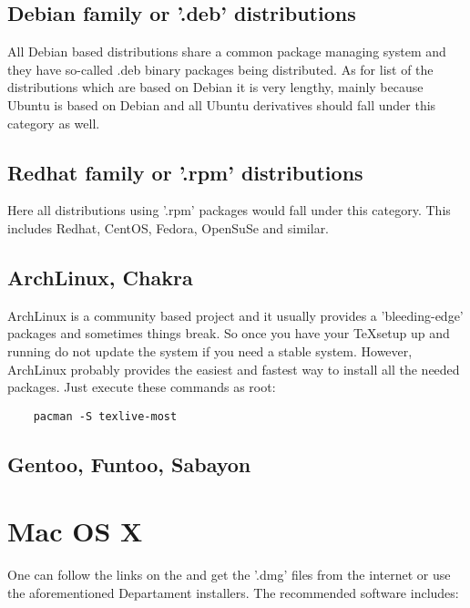 \documentclass[a4paper]{article}
\begin{document}
\subsection{Debian family or '.deb' distributions}

All Debian based distributions share a common package managing system and they
have so-called .deb binary packages being distributed. As for list of the
distributions which are based on Debian it is very lengthy, mainly because
Ubuntu is based on Debian and all Ubuntu derivatives should fall under this
category as well.


\subsection{Redhat family or '.rpm' distributions}

Here all distributions using '.rpm' packages would fall under this category.
This includes Redhat, CentOS, Fedora, OpenSuSe and similar.

\subsection{ArchLinux, Chakra}

ArchLinux is a community based project and it usually provides a 'bleeding-edge'
packages and sometimes things break. So once you have your \TeX setup up and
running do not update the system if you need a stable system. However, ArchLinux
probably provides the easiest and fastest way to install all the needed
packages. Just execute these commands as root:

\begin{verbatim}
    pacman -S texlive-most
\end{verbatim}

\subsection{Gentoo, Funtoo, Sabayon}

\section{Mac OS X}

One can follow the links on the and get the '.dmg' files from the internet or
use the aforementioned Departament installers. The recommended software
includes:
\end{document}
